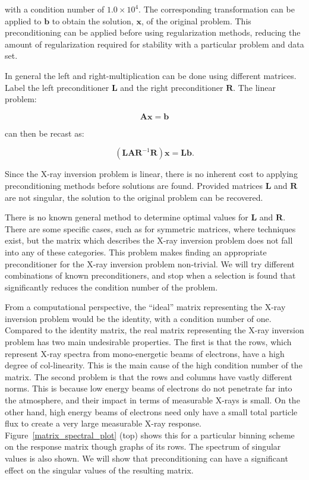 with a condition number of $1.0\times10^{4}$. The corresponding transformation can be applied to $\mathbf{b}$ to obtain the solution, $\mathbf{x}$, of the original problem. This preconditioning can be applied before using regularization methods, reducing the amount of regularization required for stability with a  particular problem and data set. 

In general the left and right-multiplication can be done using different matrices. Label the left preconditioner $\mathbf{L}$ and the right preconditioner $\mathbf{R}$. The linear problem:

$$\mathbf{A}\mathbf{x} = \mathbf{b}$$

can then be recast as:

$$(\mathbf{L}\mathbf{A}\mathbf{R}^{-1}\mathbf{R})\mathbf{x} = \mathbf{L}\mathbf{b}.$$

Since the X-ray inversion problem is linear, there is no inherent cost to applying preconditioning methods before solutions are found. Provided matrices $\mathbf{L}$ and $\mathbf{R}$ are not singular, the solution to the original problem can be recovered. 

There is no known general method to determine optimal values for $\mathbf{L}$ and $\mathbf{R}$. There are some specific cases, such as for symmetric matrices, where techniques exist, but the matrix which describes the X-ray inversion problem does not fall into any of these categories. This problem makes finding an appropriate preconditioner for the X-ray inversion problem non-trivial. We will try different combinations of known preconditioners, and stop when a selection is found that significantly reduces the condition number of the problem. 

From a computational perspective, the ``ideal'' matrix representing the X-ray inversion problem would be the identity, with a condition number of one. Compared to the identity matrix, the real matrix representing the X-ray inversion problem has two main undesirable properties. The first is that the rows, which represent X-ray spectra from mono-energetic beams of electrons, have a high degree of col-linearity. This is the main cause of the high condition number of the matrix. The second problem is that the rows and columns have vastly different norms. This is because low energy beams of electrons do not penetrate far into the atmosphere, and their impact in terms of measurable X-rays is small. On the other hand, high energy beams of electrons need only have a small total particle flux to create a very large measurable X-ray response. Figure~\ref{matrix_spectral_plot} (top) shows this for a particular binning scheme on the response matrix though graphs of its rows. The spectrum of singular values is also shown. We will show that preconditioning can have a significant effect on the singular values of the resulting matrix. 

